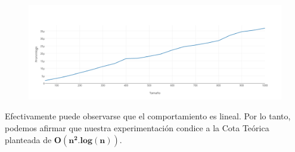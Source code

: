    \begin{figure}[h!]
   \begin{center}
 	\includegraphics[scale=0.4]{imagenes/ej3/n.png}
   \end{center}
 \end{figure}

	Efectivamente puede observarse que el comportamiento es lineal. Por lo tanto, podemos afirmar que nuestra experimentaci\'on condice a la Cota Te\'orica planteada de $\mathbf{O(n^2.log(n))}$.